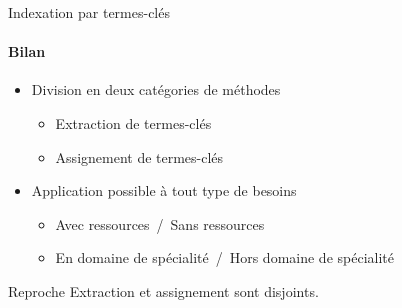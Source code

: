     \begin{frame}{Indexation par termes-clés}\framesubtitle{Bilan}
      \begin{itemize}
        \item{Division en deux catégories de méthodes}
        \begin{itemize}
          \item{Extraction de termes-clés}
          \item{Assignement de termes-clés}
        \end{itemize}
        \item{Application possible à tout type de besoins}
        \begin{itemize}
          \item{Avec ressources~/~Sans ressources}
          \item{En domaine de spécialité~/~Hors domaine de spécialité}
        \end{itemize}
      \end{itemize}

      \vspace{1em}

      \begin{alertblock}{Reproche}
        Extraction et assignement sont disjoints.
      \end{alertblock}
    \end{frame}
